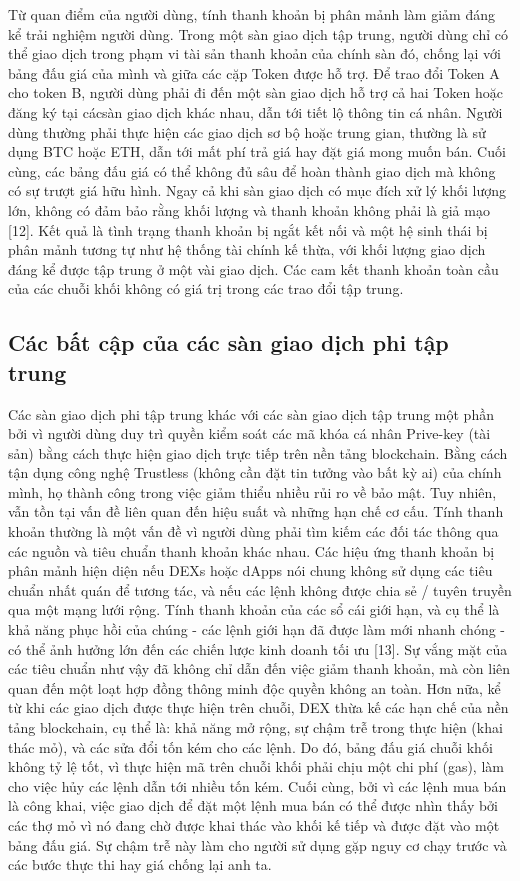 \documentclass[12pt,a4paper]{article}
\begin{document}
\begin{multicols}{2}
Từ quan điểm của người dùng, tính thanh khoản bị phân mảnh làm giảm đáng kể trải nghiệm người dùng. Trong một sàn giao dịch tập trung, người dùng chỉ có thể giao dịch trong phạm vi tài sản thanh khoản của chính sàn đó, chống lại với bảng đấu giá của mình và giữa các cặp Token được hỗ trợ. Để trao đổi Token A cho token B, người dùng phải đi đến một sàn giao dịch hỗ trợ cả hai Token hoặc đăng ký tại cácsàn giao dịch khác nhau, dẫn tới tiết lộ thông tin cá nhân. Người dùng thường phải thực hiện các giao dịch sơ bộ hoặc trung gian, thường là sử dụng BTC hoặc ETH, dẫn tới mất phí trả giá hay đặt giá mong muốn bán. Cuối cùng, các bảng đấu giá có thể không đủ sâu để hoàn thành giao dịch mà không có sự trượt giá hữu hình. Ngay cả khi sàn giao dịch có mục đích xử lý khối lượng lớn, không có đảm bảo rằng khối lượng và thanh khoản không phải là giả mạo [12].
Kết quả là tình trạng thanh khoản bị ngắt kết nối và một hệ sinh thái bị phân mảnh tương tự như hệ thống tài chính kế thừa, với khối lượng giao dịch đáng kể được tập trung ở một vài giao dịch. Các cam kết thanh khoản toàn cầu của các chuỗi khối không có giá trị trong các trao đổi tập trung.
\subsection{Các bất cập của các sàn giao dịch phi tập trung}
Các sàn giao dịch phi tập trung khác với các sàn giao dịch tập trung một phần bởi vì người dùng duy trì quyền kiểm soát các mã khóa cá nhân Prive-key (tài sản) bằng cách thực hiện giao dịch trực tiếp trên nền tảng blockchain. Bằng cách tận dụng công nghệ Trustless (không cần đặt tin tưởng vào bất kỳ ai) của chính mình, họ thành công trong việc giảm thiểu nhiều rủi ro về bảo mật. Tuy nhiên, vẫn tồn tại vấn đề liên quan đến hiệu suất và những hạn chế cơ cấu.
Tính thanh khoản thường là một vấn đề vì người dùng phải tìm kiếm các đối tác thông qua các nguồn và tiêu chuẩn thanh khoản khác nhau. Các hiệu ứng thanh khoản bị phân mảnh hiện diện nếu DEXs hoặc dApps nói chung không sử dụng các tiêu chuẩn nhất quán để tương tác, và nếu các lệnh không được chia sẻ / tuyên truyền qua một mạng lưới rộng. Tính thanh khoản của các sổ cái giới hạn, và cụ thể là khả năng phục hồi của chúng - các lệnh giới hạn đã được làm mới nhanh chóng - có thể ảnh hưởng lớn đến các chiến lược kinh doanh tối ưu [13]. Sự vắng mặt của các tiêu chuẩn như vậy đã không chỉ dẫn đến việc giảm thanh khoản, mà còn liên quan đến một loạt hợp đồng thông minh độc quyền không an toàn.
Hơn nữa, kể từ khi các giao dịch được thực hiện trên chuỗi, DEX thừa kế các hạn chế của nền tảng blockchain, cụ thể là: khả năng mở rộng, sự chậm trễ trong thực hiện (khai thác mỏ), và các sửa đổi tốn kém cho các lệnh. Do đó, bảng đấu giá chuỗi khối không tỷ lệ tốt, vì thực hiện mã trên chuỗi khối phải chịu một chi phí (gas), làm cho việc hủy các lệnh dẫn tới nhiều tốn kém.
Cuối cùng, bởi vì các lệnh mua bán là công khai, việc giao dịch để đặt một lệnh mua bán có thể được nhìn thấy bởi các thợ mỏ vì nó đang chờ được khai thác vào khối kế tiếp và được đặt vào một bảng đấu giá. Sự chậm trễ này làm cho người sử dụng gặp nguy cơ chạy trước và các bước thực thi hay giá chống lại anh ta.

\end{multicols}
\end{document}
